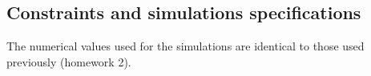 \subsection{Constraints and simulations specifications}
The numerical values used for the simulations are identical to those used previously (homework 2).\par
